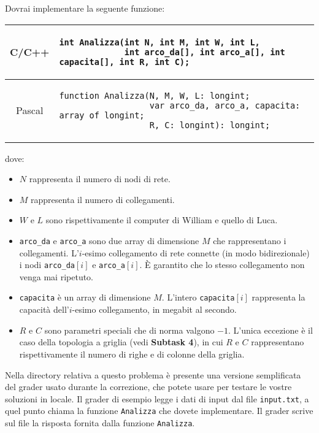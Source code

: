 Dovrai implementare la seguente funzione:

\begin{center}\begin{tabular}{|c|l|}
\hline
C/C++    & \begin{minipage}{.87\textwidth}
\begin{verbatim}
int Analizza(int N, int M, int W, int L,
             int arco_da[], int arco_a[], int capacita[], int R, int C);
\end{verbatim}
\end{minipage}\\
\hline
Pascal & \begin{minipage}{.87\textwidth}
\begin{verbatim}
function Analizza(N, M, W, L: longint;
                  var arco_da, arco_a, capacita: array of longint;
                  R, C: longint): longint;
\end{verbatim}
\end{minipage}\\
\hline
\end{tabular}\end{center}
dove:
\begin{itemize}[nolistsep, itemsep=2mm]
	\item $N$ rappresenta il numero di nodi di rete.
	\item $M$ rappresenta il numero di collegamenti.
	\item $W$ e $L$ sono rispettivamente il computer di William e quello di Luca.
	\item \texttt{arco\_da} e \texttt{arco\_a} sono due array di dimensione $M$ che rappresentano i collegamenti. L'$i$-esimo collegamento di rete connette (in modo bidirezionale) i nodi \texttt{arco\_da}$[i]$ e \texttt{arco\_a}$[i]$. È garantito che lo stesso collegamento non venga mai ripetuto.
	\item \texttt{capacita} è un array di dimensione $M$. L'intero \texttt{capacita}$[i]$ rappresenta la capacità dell'$i$-esimo collegamento, in megabit al secondo.
	\item $R$ e $C$ sono parametri speciali che di norma valgono $-1$. L'unica eccezione è il caso della topologia a griglia (vedi \textbf{Subtask 4}), in cui $R$ e $C$ rappresentano rispettivamente il numero di righe e di colonne della griglia.
\end{itemize}

\Grader
Nella directory relativa a questo problema è presente una versione 
semplificata del grader usato durante la correzione, che potete usare
per testare le vostre soluzioni in locale. Il grader di esempio legge
i dati di input dal file \texttt{input.txt}, a quel punto chiama la
funzione \texttt{Analizza} che dovete implementare. Il grader scrive sul file \outputfile{} la risposta fornita dalla funzione \texttt{Analizza}.

